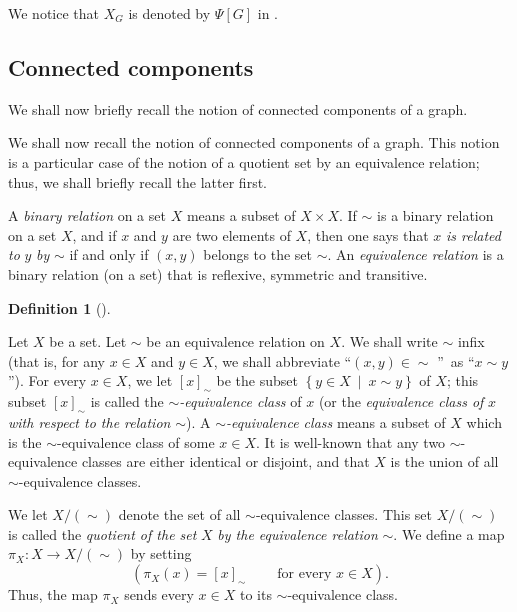 \documentclass[numbers=enddot,12pt,final,onecolumn,notitlepage]{scrartcl}%
\theoremstyle{definition}
\newtheorem{defi}[theo]{Definition}
\newenvironment{definition}[1][]
{\begin{defi}[#1]\begin{leftbar}}
{\end{leftbar}\end{defi}}
\newenvironment{verlong}{}{}
\newenvironment{vershort}{}{}
\begin{document}
We notice that $X_{G}$ is denoted by $\Psi\left[  G\right]  $ in
\cite[\S 7.3.3]{Reiner}.

\subsection{Connected components}

\begin{vershort}
We shall now briefly recall the notion of connected components of a graph.
\end{vershort}

\begin{verlong}
We shall now recall the notion of connected components of a graph. This notion
is a particular case of the notion of a quotient set by an equivalence
relation; thus, we shall briefly recall the latter first.

A \textit{binary relation} on a set $X$ means a subset of $X\times X$. If
$\sim$ is a binary relation on a set $X$, and if $x$ and $y$ are two elements
of $X$, then one says that $x$ \textit{is related to }$y$ \textit{by }$\sim$
if and only if $\left(  x,y\right)  $ belongs to the set $\sim$. An
\textit{equivalence relation} is a binary relation (on a set) that is
reflexive, symmetric and transitive.

\begin{definition}
\label{def.relquot}Let $X$ be a set. Let $\sim$ be an equivalence relation on
$X$. We shall write $\sim$ infix (that is, for any $x\in X$ and $y\in X$, we
shall abbreviate \textquotedblleft$\left(  x,y\right)  \in\sim$%
\textquotedblright\ as \textquotedblleft$x\sim y$\textquotedblright). For
every $x\in X$, we let $\left[  x\right]  _{\sim}$ be the subset $\left\{
y\in X\ \mid\ x\sim y\right\}  $ of $X$; this subset $\left[  x\right]
_{\sim}$ is called the $\sim$\textit{-equivalence class} of $x$ (or the
\textit{equivalence class of }$x$ \textit{with respect to the relation }$\sim
$). A $\sim$\textit{-equivalence class} means a subset of $X$ which is the
$\sim$-equivalence class of some $x\in X$. It is well-known that any two
$\sim$-equivalence classes are either identical or disjoint, and that $X$ is
the union of all $\sim$-equivalence classes.

We let $X/\left(  \sim\right)  $ denote the set of all $\sim$-equivalence
classes. This set $X/\left(  \sim\right)  $ is called the \textit{quotient of
the set }$X$ \textit{by the equivalence relation }$\sim$. We define a map
$\pi_{X}:X\rightarrow X/\left(  \sim\right)  $ by setting%
\[
\left(  \pi_{X}\left(  x\right)  =\left[  x\right]  _{\sim}%
\ \ \ \ \ \ \ \ \ \ \text{for every }x\in X\right)  .
\]
Thus, the map $\pi_{X}$ sends every $x\in X$ to its $\sim$-equivalence class.
\end{definition}


\end{verlong}
\end{document}
